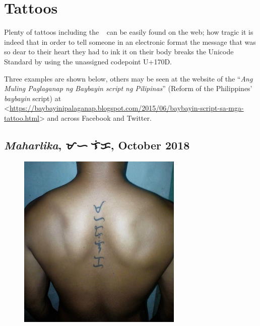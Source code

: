 \documentclass[a4paper,pagesize,openany,14pt,parskip=never]{scrbook}
\newcommand{\≈}{$\approx$}
\newcommand{\ra}{{\baybayin ᜍ}}
\begin{document}
\section{Tattoos}

Plenty of tattoos including the \ra\ can be easily found on the web; how tragic it is indeed that in order to tell someone in an electronic format the message that was so dear to their heart they had to ink it on their body breaks the Unicode Standard by using the unassigned codepoint U+170D.

Three examples are shown below, others may be seen at the website of the ``{\em Ang Muling Paglaganap ng Baybayin script ng Pilipinas}'' (Reform of the Philippines' {\em baybayin} script) at <\url{https://baybayinipalaganap.blogspot.com/2015/06/baybayin-script-sa-mga-tattoo.html}> and across Facebook and Twitter.

\subsection{{\em Maharlika}, {\baybayin ᜋᜑᜍ᜔ᜎᜒᜃ}, October 2018}
\begin{figure}[H]
\includegraphics[width=0.7\textwidth]{Maharlika}
\end{figure}
\end{document}
